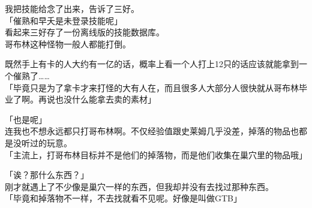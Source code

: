 我把技能给念了出来，告诉了三好。\\

「催熟和早夭是未登录技能呢」\\

看起来三好存了一份离线版的技能数据库。\\

哥布林这种怪物一般人都能打倒。

既然手上有卡的人大约有一亿的话，概率上看一个人打上12只的话应该就能拿到一个催熟了……\\

「毕竟只是为了拿卡才来打怪的大有人在，而且很多人大部分人很快就从哥布林毕业了啊。再说也没什么能拿去卖的素材」

「也是呢」\\

连我也不想永远都只打哥布林啊。不仅经验值跟史莱姆几乎没差，掉落的物品也都是没听过的玩意。\\

「主流上，打哥布林目标并不是他们的掉落物，而是他们收集在巢穴里的物品哦」

「诶？那什么东西？」\\

刚才就遇上了不少像是巢穴一样的东西，但我却并没有去找过那种东西。\\

「毕竟和掉落物不一样，不去找就看不见呢。好像是叫做GTB」

